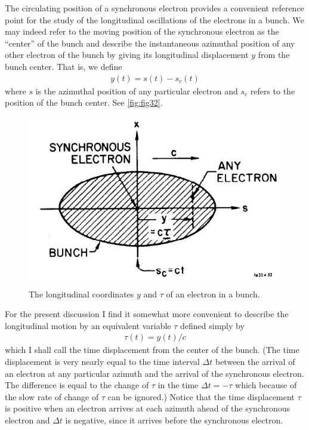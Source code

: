 The circulating position of a synchronous electron provides a convenient reference point for the study of the longitudinal oscillations of the electrons in a bunch. We may indeed refer to the moving position of the synchronous electron as the “center” of the bunch and describe the instantaneous azimuthal position of any other electron of the bunch by giving its longitudinal displacement $y$ from the bunch center. That is, we define
\begin{align}
	y(t) = s(t) - s_c(t)
\end{align}
where $s$ is the azimuthal position of any particular electron and $s_c$ refers to the position of the bunch center. See \autoref{fig:fig32}.

\begin{figure}[!htb]
	\centering
	\includegraphics[width=0.6\linewidth]{./Figuras/fig32.jpeg}
	\caption{The longitudinal coordinates $y$ and $\tau$ of an electron in a bunch.}
	\label{fig:fig32}
\end{figure}

For the present discussion I find it somewhat more convenient to describe the longitudinal motion by an equivalent variable $\tau$ defined simply by
\begin{align}
	\tau(t) = y(t)/c
\end{align}
which I shall call the time displacement from the center of the bunch. (The time displacement is very nearly equal to the time interval $\Delta t$ between the arrival of an electron at any particular azimuth and the arrival of the synchronous electron. The difference is equal to the change of $\tau$ in the time $\Delta t = - \tau$ which because of the slow rate of change of $\tau$ can be ignored.) Notice that the time displacement $\tau$ is positive when an electron arrives at each azimuth ahead of the synchronous electron and $\Delta t$ is negative, since it arrives before the synchronous electron.

